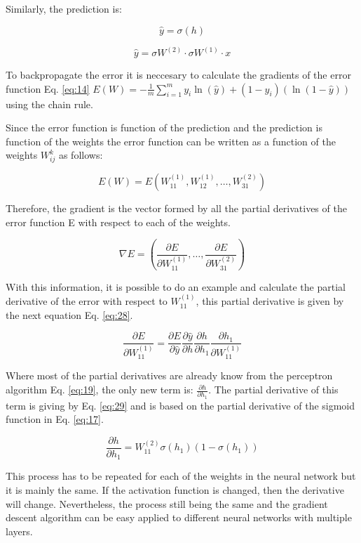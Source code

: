 \documentclass{article}
\begin{document}
Similarly, the prediction is:

\[\hat{y} = \sigma(h)\]

\[\hat{y} = \sigma W^{(2)} \cdot \sigma W^{(1)} \cdot x\]

To backpropagate the error it is neccesary to calculate the gradients of the error function Eq. \eqref{eq:14} \(E(W) = - \frac{1}{m} \sum_{i=1}^m y_i\ln{(\hat{y})} + (1 - y_i) (\ln{(1 - \hat{y})})\) using the chain rule.

Since the error function is function of the prediction and the prediction is function of the weights the error function can be written as a function of the weights \(W_{ij}^{k}\) as follows:

\[E(W) = E(W_{11}^{(1)}, W_{12}^{(1)}, \dots, W_{31}^{(2)})\]

Therefore, the gradient is the vector formed by all the partial derivatives of the error function E with respect to each of the weights.

\[\nabla E = (\frac{\partial E}{\partial W_{11}^{(1)}}, \dots, \frac{\partial E}{\partial W_{31}^{(2)}})\]

With this information, it is possible to do an example and calculate the partial derivative of the error with respect to \(W_{11}^{(1)}\), this partial derivative is given by the next equation Eq. \eqref{eq:28}.

\begin{equation}
\label{eq:28}
\frac{\partial E}{\partial W_{11}^{(1)}} = \frac{\partial E}{\partial \hat{y}} \frac{\partial \hat{y}}{\partial h} \frac{\partial h}{\partial h_1} \frac{\partial h_1}{\partial W_{11}^{(1)}}
\end{equation}

Where most of the partial derivatives are already know from the perceptron algorithm Eq. \eqref{eq:19}, the only new term is: \(\frac{\partial h}{\partial h_1} \). The partial derivative of this term is giving by Eq. \eqref{eq:29} and is based on the partial derivative of the sigmoid function in Eq. \eqref{eq:17}.

\begin{equation}
\label{eq:29}
\frac{\partial h}{\partial h_1} = W_{11}^{(2)} \sigma(h_1)(1 - \sigma(h_1))
\end{equation}

This process has to be repeated for each of the weights in the neural network but it is mainly the same. If the activation function is changed, then the derivative will change. Nevertheless, the process still being the same and the gradient descent algorithm can be easy applied to different neural networks with multiple layers.
\end{document}
